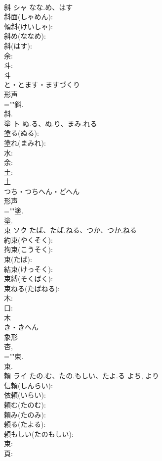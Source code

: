 \documentclass[8pt]{extreport}
\begin{document}
\begin{CJK}{UTF8}{min}
\\	斜	シャ	なな.め、はす		
\\	斜面(しゃめん): 
\\	傾斜(けいしゃ): 
\\	斜め(ななめ): 
\\	斜(はす): 
\\	余: 
\\	斗: 
\\	斗	
\\	と・とます・ますづくり	
\\	形声 
\\	=""斜.
\\	斜.
\\	塗	ト	ぬ.る、ぬ.り、まみ.れる		
\\	塗る(ぬる): 
\\	塗れ(まみれ): 
\\	水: 
\\	余: 
\\	土: 
\\	土	
\\	つち・つちへん・どへん	
\\	形声 
\\	=""塗.
\\	塗.
\\	束	ソク	たば、たば.ねる、つか、つか.ねる		
\\	約束(やくそく): 
\\	拘束(こうそく): 
\\	束(たば): 
\\	結束(けっそく): 
\\	束縛(そくばく): 
\\	束ねる(たばねる): 
\\	木: 
\\	口: 
\\	木	
\\	き・きへん	
\\	象形 
\\	杏, 
\\	=""束.
\\	束.
\\	頼	ライ	たの.む、たの.もしい、たよ.る	よち, より	
\\	信頼(しんらい): 
\\	依頼(いらい): 
\\	頼む(たのむ): 
\\	頼み(たのみ): 
\\	頼る(たよる): 
\\	頼もしい(たのもしい): 
\\	束: 
\\	頁: 

\end{CJK}
\end{document}
